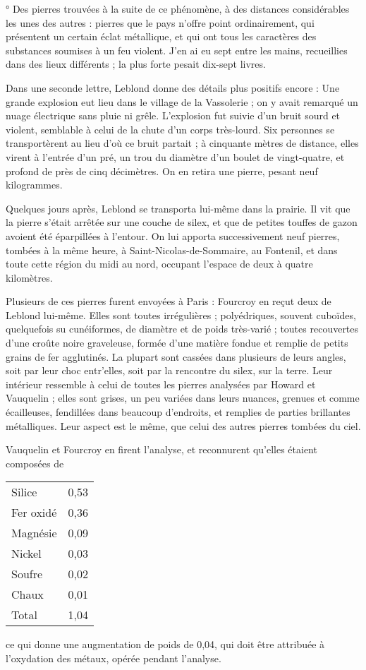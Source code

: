 \documentclass[a4paper, 12pt, oneside, french]{article}
\begin{document}
° Des pierres trouvées à la suite de ce phénomène, à des distances considérables les unes des autres : pierres que le pays n'offre point ordinairement, qui présentent un certain éclat métallique, et qui ont tous les caractères des substances soumises à un feu violent. J'en ai eu sept entre les mains, recueillies dans des lieux différents ; la plus forte pesait dix-sept livres. \fg

Dans une seconde lettre, Leblond donne des détails plus positifs encore : \og Une grande explosion eut lieu dans le village de la Vassolerie ; on y avait remarqué un nuage électrique sans pluie ni grêle. L'explosion fut suivie d'un bruit sourd et violent, semblable à celui de la chute d'un corps très-lourd. Six personnes se transportèrent au lieu d'où ce bruit partait ; à cinquante mètres de distance, elles virent à l'entrée d'un pré, un trou du diamètre d'un boulet de vingt-quatre, et profond de près de cinq décimètres. On en retira une pierre, pesant neuf kilogrammes. \fg

Quelques jours après, Leblond se transporta lui-même dans la prairie. Il vit que la pierre s'était arrêtée sur une couche de silex, et que de petites touffes de gazon avoient été éparpillées à l'entour. On lui apporta successivement neuf pierres, tombées à la même heure, à Saint-Nicolas-de-Sommaire, au Fontenil, et dans toute cette région du midi au nord, occupant l'espace de deux à quatre kilomètres.

Plusieurs de ces pierres furent envoyées à Paris : Fourcroy en reçut deux de Leblond lui-même. Elles sont toutes irrégulières ; polyédriques, souvent cuboïdes, quelquefois su cunéiformes, de diamètre et de poids très-varié ; toutes recouvertes d'une croûte noire graveleuse, formée d'une matière fondue et remplie de petits grains de fer agglutinés. La plupart sont cassées dans plusieurs de leurs angles, soit par leur choc entr'elles, soit par la rencontre du silex, sur la terre. Leur intérieur ressemble à celui de toutes les pierres analysées par Howard et Vauquelin ; elles sont grises, un peu variées dans leurs nuances, grenues et comme écailleuses, fendillées dans beaucoup d'endroits, et remplies de parties brillantes métalliques. Leur aspect est le même, que celui des autres pierres tombées du ciel.

Vauquelin et Fourcroy en firent l'analyse, et reconnurent qu'elles étaient composées de
\begin{table}[H]
    \centering
    \Fontauri
    \large
    \begin{tabular}{l r}
        Silice & 0,53 \\
        Fer oxidé & 0,36 \\
        Magnésie & 0,09 \\
        Nickel & 0,03 \\
        Soufre & 0,02 \\
        Chaux & 0,01 \\ \hline
        Total & 1,04 \\
    \end{tabular}
\end{table}
ce qui donne une augmentation de poids de 0,04, qui doit être attribuée à l'oxydation des métaux, opérée pendant l'analyse.
\end{document}
